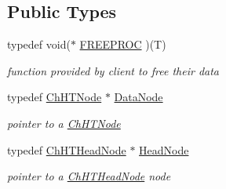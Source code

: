 \subsection*{Public Types}
\begin{DoxyCompactItemize}
\item 
\hypertarget{classChHashTable_a4cdeb8c440ef53bf15304c154f2ca950}{typedef void($\ast$ \hyperlink{classChHashTable_a4cdeb8c440ef53bf15304c154f2ca950}{F\-R\-E\-E\-P\-R\-O\-C} )(T)}\label{classChHashTable_a4cdeb8c440ef53bf15304c154f2ca950}

\begin{DoxyCompactList}\small\item\em function provided by client to free their data \end{DoxyCompactList}\item 
\hypertarget{classChHashTable_a3fbb8fddd32b61fba7814d6a90d2dedc}{typedef \hyperlink{structChHashTable_1_1ChHTNode}{Ch\-H\-T\-Node} $\ast$ \hyperlink{classChHashTable_a3fbb8fddd32b61fba7814d6a90d2dedc}{Data\-Node}}\label{classChHashTable_a3fbb8fddd32b61fba7814d6a90d2dedc}

\begin{DoxyCompactList}\small\item\em pointer to a \hyperlink{structChHashTable_1_1ChHTNode}{Ch\-H\-T\-Node} \end{DoxyCompactList}\item 
\hypertarget{classChHashTable_ab30f44a92efea296a6af396e9f583ab4}{typedef \hyperlink{structChHashTable_1_1ChHTHeadNode}{Ch\-H\-T\-Head\-Node} $\ast$ \hyperlink{classChHashTable_ab30f44a92efea296a6af396e9f583ab4}{Head\-Node}}\label{classChHashTable_ab30f44a92efea296a6af396e9f583ab4}

\begin{DoxyCompactList}\small\item\em pointer to a \hyperlink{structChHashTable_1_1ChHTHeadNode}{Ch\-H\-T\-Head\-Node} node \end{DoxyCompactList}\end{DoxyCompactItemize}
